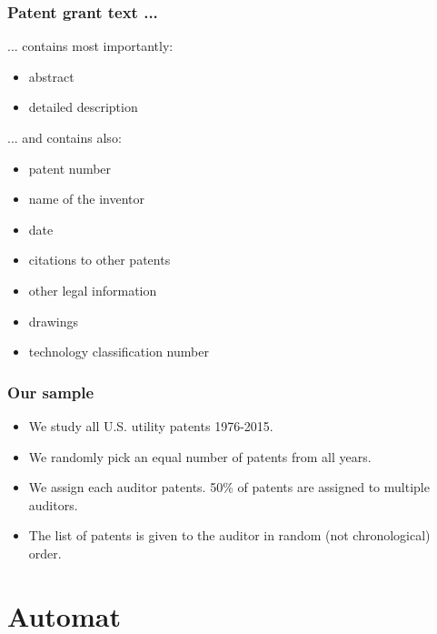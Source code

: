 \documentclass[10pt]{beamer}
\begin{document}
\begin{frame}\frametitle{Patent grant text ...}
... contains most importantly:
	\begin{itemize}	
		\item abstract
		\item detailed description
	\end{itemize}
... and contains also:
	\begin{itemize}	
		\item patent number
		\item name of the inventor
		\item date
		\item citations to other patents
		\item other legal information
		\item drawings
		\item technology classification number
	\end{itemize}
\end{frame}


\begin{frame}\frametitle{Our sample}
	\begin{itemize}	
	\item We study all U.S. utility patents 1976-2015.
	\item We randomly pick an equal number of patents from all years.
	\item We assign each auditor patents. 50\% of patents are assigned to multiple auditors.
	\item The list of patents is given to the auditor in random (not chronological) order.
	\end{itemize}
\end{frame}


\section{Automat}
\setcounter{subsection}{1} %
\end{document}
